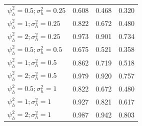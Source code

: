\documentclass[AMA,STIX1COL,]{WileyNJD-v2}
\begin{document}
\begin{table}[ht]
{\begin{tabular}{l c c c }
\cline{2-4}
$\psi_h^2 = 0.5; \sigma_h^2 = 0.25$ & 0.608 & 0.468 & 0.320 \\
$\psi_h^2 = 1; \sigma_h^2 = 0.25$ & 0.822 & 0.672 & 0.480 \\
$\psi_h^2 = 2; \sigma_h^2 = 0.25$ & 0.973 & 0.901 & 0.734 \\
$\psi_h^2 = 0.5; \sigma_h^2 = 0.5$ & 0.675 & 0.521 & 0.358 \\
$\psi_h^2 = 1; \sigma_h^2 = 0.5$ & 0.862 & 0.719 & 0.518 \\
$\psi_h^2 = 2; \sigma_h^2 = 0.5$ & 0.979 & 0.920 & 0.757 \\
$\psi_h^2 = 0.5; \sigma_h^2 = 1$ & 0.822 & 0.672 & 0.480 \\
$\psi_h^2 = 1; \sigma_h^2 = 1$ & 0.927 & 0.821 & 0.617 \\
$\psi_h^2 = 2; \sigma_h^2 = 1$ & 0.987 & 0.942 & 0.803 \\
\bottomrule
\end{tabular}}
\end{table}
\end{document}
